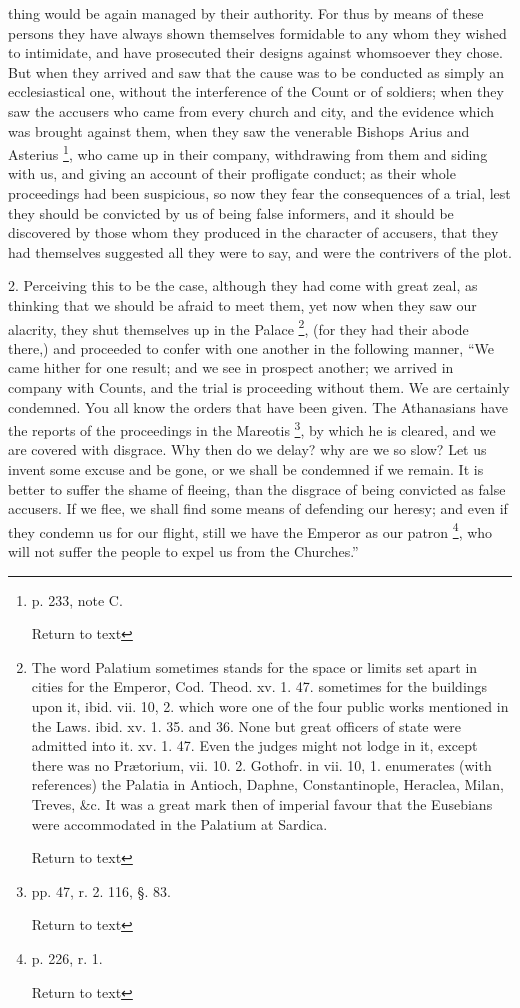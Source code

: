 thing would be again managed by their authority. For thus by means of
these persons they have always shown themselves formidable to any whom
they wished to intimidate, and have prosecuted their designs against
whomsoever they chose. But when they arrived and saw that the cause was to be conducted as simply an ecclesiastical one, without the
interference of the Count or of soldiers; when they saw the accusers
who came from every church and city, and the evidence which was
brought against them, when they saw the venerable Bishops Arius and
Asterius \footnote{p. 233, note C.

Return to text}, who came up
in their company, withdrawing from them and siding with us, and giving
an account of their profligate conduct; as their whole proceedings had
been suspicious, so now they fear the consequences of a trial, lest
they should be convicted by us of being false informers, and it should
be discovered by those whom they produced in the character of
accusers, that they had themselves suggested all they were to say, and
were the contrivers of the plot.

2. Perceiving this to be the case, although they
had come with great zeal, as thinking that we should be afraid to meet
them, yet now when they saw our alacrity, they shut themselves up in
the Palace \footnote{The word Palatium sometimes stands for the space or limits set apart
in cities for the Emperor, Cod. Theod. xv. 1. 47. sometimes for the
buildings upon it, ibid. vii. 10, 2. which wore one of the four public
works mentioned in the Laws. ibid. xv. 1. 35. and 36. None but great
officers of state were admitted into it. xv. 1. 47. Even the judges
might not lodge in it, except there was no Prætorium, vii. 10. 2.
Gothofr. in vii. 10, 1. enumerates (with references) the Palatia in
Antioch, Daphne, Constantinople, Heraclea, Milan, Treves, \&c. It
was a great mark then of imperial favour that the Eusebians were
accommodated in the Palatium at Sardica.

Return to text}, (for they had
their abode there,) and proceeded to confer with one another in the
following manner, ``We came hither for one result; and we see in
prospect another; we arrived in company with Counts, and the trial is
proceeding without them. We are certainly condemned. You all know the
orders that have been given. The Athanasians have the reports of the
proceedings in the Mareotis \footnote{pp. 47, r. 2. 116, §. 83.

Return to text},
by which he is cleared, and we are covered with disgrace. Why then do
we delay? why are we so slow? Let us invent some excuse and be gone,
or we shall be condemned if we remain. It is better to suffer the
shame of fleeing, than the disgrace of being convicted as false
accusers. If we flee, we shall find some means of defending our
heresy; and even if they condemn us for our flight, still we have the
Emperor as our patron \footnote{p. 226, r. 1.

Return to text},
who will not suffer the people to expel us from the Churches.''

